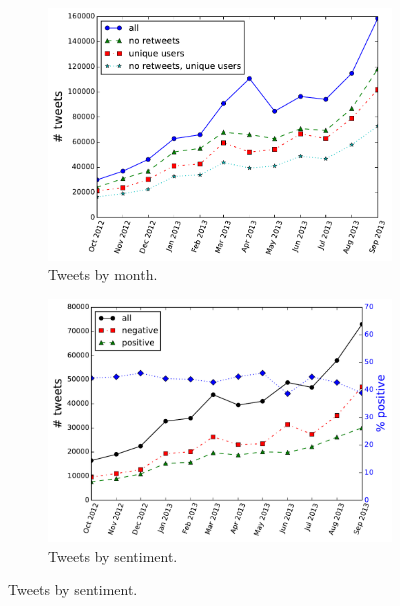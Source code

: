 \documentclass{sig-alternate}
\begin{document}


\begin{figure}[t]
  \caption{Tweets by month and sentiment $\ge$.}
  \begin{subfigure}{.96\columnwidth}
    \centering
    \caption{Tweets by month. \label{f.total}}
    \includegraphics[width=\columnwidth]{nb/raw_counts.pdf}  %
  \end{subfigure}
  \begin{subfigure}{\columnwidth}
    \centering
    \caption{Tweets by sentiment. \label{f.sentiment}}
    \includegraphics[width=\columnwidth]{nb/sentiment.pdf}
  \end{subfigure}
\end{figure}
\end{document}
